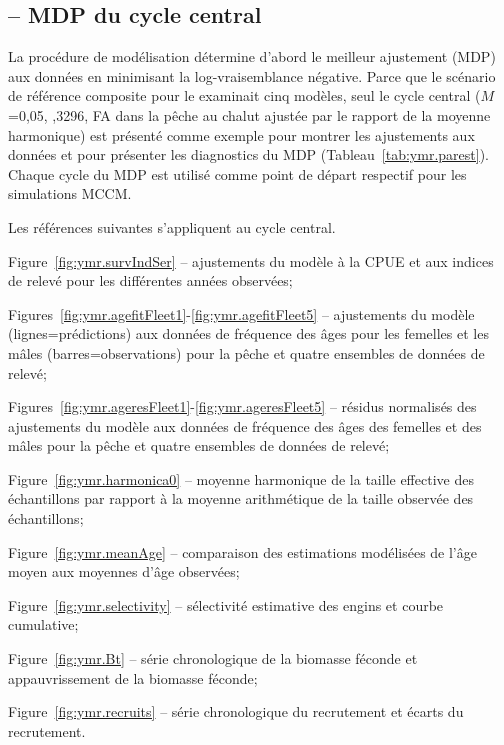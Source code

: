 \documentclass[11pt]{book}
\begin{document}
\subsection{\SPC{} -- MDP du cycle central}


La proc\'{e}dure de mod\'{e}lisation d\'{e}termine d'abord le meilleur ajustement (MDP) aux donn\'{e}es en minimisant la log-vraisemblance n\'{e}gative.
Parce que le sc\'{e}nario de r\'{e}f\'{e}rence composite pour le \BCa{} examinait  cinq mod\`{e}les, seul le cycle central ($M$=0,05, ,3296, FA dans la p\^{e}che au chalut ajust\'{e}e par le rapport de la moyenne harmonique) est pr\'{e}sent\'{e} comme exemple pour montrer les ajustements aux donn\'{e}es et pour pr\'{e}senter les diagnostics du MDP (Tableau~\ref{tab:ymr.parest}).
Chaque cycle du MDP est utilis\'{e} comme point de d\'{e}part respectif pour les simulations MCCM.

Les r\'{e}f\'{e}rences suivantes s'appliquent au cycle central.
\begin{itemize_csas}{}{}
  \item Figure~\ref{fig:ymr.survIndSer} -- ajustements du mod\`{e}le \`{a} la CPUE et aux indices de relev\'{e} pour les diff\'{e}rentes ann\'{e}es observ\'{e}es;
  \item Figures~\ref{fig:ymr.agefitFleet1}-\ref{fig:ymr.agefitFleet5} -- ajustements du mod\`{e}le (lignes=pr\'{e}dictions) aux donn\'{e}es de fr\'{e}quence des \^{a}ges pour les femelles et les m\^{a}les (barres=observations) pour la p\^{e}che et quatre ensembles de donn\'{e}es de relev\'{e};
  \item Figures~\ref{fig:ymr.ageresFleet1}-\ref{fig:ymr.ageresFleet5} -- r\'{e}sidus normalis\'{e}s des ajustements du mod\`{e}le aux donn\'{e}es de fr\'{e}quence des \^{a}ges des femelles et des m\^{a}les pour la p\^{e}che et quatre ensembles de donn\'{e}es de relev\'{e};
  \item Figure~\ref{fig:ymr.harmonica0} -- moyenne harmonique de la taille effective des \'{e}chantillons par rapport \`{a} la moyenne arithm\'{e}tique de la taille observ\'{e}e des \'{e}chantillons;
  \item Figure~\ref{fig:ymr.meanAge} -- comparaison des estimations mod\'{e}lis\'{e}es de l'\^{a}ge moyen aux moyennes d'\^{a}ge observ\'{e}es;
  \item Figure~\ref{fig:ymr.selectivity} -- s\'{e}lectivit\'{e} estimative des engins et courbe cumulative;
  \item Figure~\ref{fig:ymr.Bt} -- s\'{e}rie chronologique de la biomasse f\'{e}conde et appauvrissement de la biomasse f\'{e}conde;
  \item Figure~\ref{fig:ymr.recruits} -- s\'{e}rie chronologique du recrutement et \'{e}carts du recrutement.
\end{itemize_csas}
\end{document}
